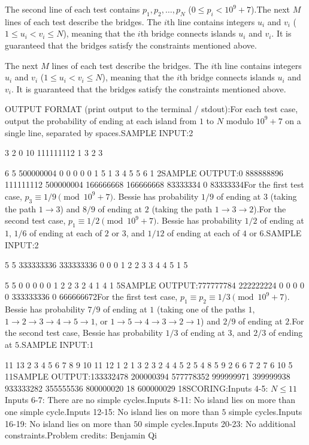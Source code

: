 \documentclass[12pt]{article}
\begin{document}
The second line of each test contains $p_1, p_2,\dots, p_N$ ($0\le p_i<10^9+7$).The next $M$ lines of each test describe the bridges. The $i$th line contains
integers $u_i$ and $v_i$ ($1\le u_i<v_i\le N$), meaning that the $i$th  bridge
connects islands $u_i$ and $v_i$. It is guaranteed that the bridges satisfy the
constraints mentioned above.

The next $M$ lines of each test describe the bridges. The $i$th line contains
integers $u_i$ and $v_i$ ($1\le u_i<v_i\le N$), meaning that the $i$th  bridge
connects islands $u_i$ and $v_i$. It is guaranteed that the bridges satisfy the
constraints mentioned above.

OUTPUT FORMAT (print output to the terminal / stdout):For each test case, output the probability of ending at each island from $1$ to
$N$ modulo $10^9+7$ on a single line, separated by spaces.SAMPLE INPUT:2

3 2
0 10 111111112
1 3
2 3

6 5
500000004 0 0 0 0 0
1 5
1 3
4 5
5 6
1 2SAMPLE OUTPUT:0 888888896 111111112
500000004 166666668 166666668 83333334 0 83333334For the first test case, $p_3\equiv 1/9 \pmod{10^9+7}$. Bessie has  probability
$1/9$ of ending at $3$ (taking the path $1\to 3$) and $8/9$  of ending at $2$
(taking the path $1\to 3\to 2$).For the second test case, $p_1\equiv 1/2\pmod{10^9+7}$. Bessie has probability 
$1/2$ of ending at $1$,  $1/6$ of ending at each of $2$ or $3$, and $1/12$  of
ending at each of $4$ or $6$.SAMPLE INPUT:2

5 5
333333336 333333336 0 0 0
1 2
2 3
3 4
4 5
1 5

5 5
0 0 0 0 0
1 2
2 3
2 4
1 4
1 5SAMPLE OUTPUT:777777784 222222224 0 0 0
0 0 333333336 0 666666672For the first test case, $p_1\equiv p_2\equiv 1/3\pmod{10^9+7}$.  Bessie has
probability $7/9$ of ending at $1$ (taking one of the paths $1$,
$1\to 2\to 3\to 4\to 5\to 1$, or $1\to 5\to 4\to 3\to 2\to 1$) and $2/9$ of
ending at $2$.For the second test case, Bessie has probability $1/3$ of ending at $3$, and
$2/3$ of ending at $5$.SAMPLE INPUT:1

11 13
2 3 4 5 6 7 8 9 10 11 12
1 2
1 3
2 3
2 4
4 5
2 5
4 8
5 9
2 6
6 7
2 7
6 10
5 11SAMPLE OUTPUT:133332478 200000394 577778352 999999971 399999938 933333282 355555536 800000020 18 600000029 18SCORING:Inputs 4-5: $N\le 11$Inputs 6-7: There are no simple cycles.Inputs 8-11: No island lies on more than one simple cycle.Inputs 12-15: No island lies on more than $5$ simple cycles.Inputs 16-19: No island lies on more than $50$ simple cycles.Inputs 20-23: No additional constraints.Problem credits: Benjamin Qi
\end{document}
